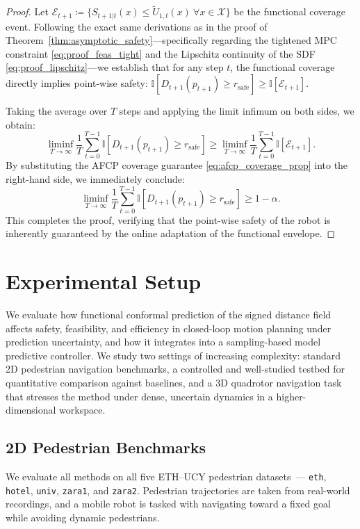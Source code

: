\documentclass[lettersize,journal]{IEEEtran}
\begin{document}
\begin{proof}
Let $\mathcal E_{t+1} \coloneqq \{ S_{t+1|t}(x)\le \widetilde U_{1,t}(x)\ \forall x\in\mathcal X \}$ be the functional coverage event.
Following the exact same derivations as in the proof of Theorem~\ref{thm:asymptotic_safety}—specifically regarding the tightened MPC constraint \eqref{eq:proof_feas_tight} and the Lipschitz continuity of the SDF \eqref{eq:proof_lipschitz}—we establish that for any step $t$, the functional coverage directly implies point-wise safety:
$\mathbb I\!\left[D_{t+1}(p_{t+1})\ge r_{\mathrm{safe}}\right] \ge \mathbb I[\mathcal E_{t+1}]$.

Taking the average over $T$ steps and applying the limit infimum on both sides, we obtain:
\[
\liminf_{T\to\infty} \frac{1}{T}\sum_{t=0}^{T-1} \mathbb I\!\left[D_{t+1}(p_{t+1})\ge r_{\mathrm{safe}}\right] \ge \liminf_{T\to\infty} \frac{1}{T}\sum_{t=0}^{T-1}\mathbb I[\mathcal E_{t+1}].
\]
By substituting the AFCP coverage guarantee \eqref{eq:afcp_coverage_prop} into the right-hand side, we immediately conclude:
\[
\liminf_{T\to\infty} \frac{1}{T}\sum_{t=0}^{T-1} \mathbb I\!\left[D_{t+1}(p_{t+1})\ge r_{\mathrm{safe}}\right] \ge 1-\alpha.
\]
This completes the proof, verifying that the point-wise safety of the robot is inherently guaranteed by the online adaptation of the functional envelope.
\end{proof}


\section{Experimental Setup}
We evaluate how functional conformal prediction of the signed distance field affects
safety, feasibility, and efficiency in closed-loop motion planning under prediction
uncertainty, and how it integrates into a sampling-based model predictive controller.
We study two settings of increasing complexity: standard 2D pedestrian navigation
benchmarks, a controlled and well-studied testbed for quantitative comparison against
baselines, and a 3D quadrotor navigation task that stresses the method under dense,
uncertain dynamics in a higher-dimensional workspace.

\subsection{2D Pedestrian Benchmarks}
We evaluate all methods on all five ETH--UCY pedestrian datasets~\cite{pellegrini2009you,lerner2007crowds}---
\texttt{eth}, \texttt{hotel}, \texttt{univ}, \texttt{zara1}, and \texttt{zara2}.
Pedestrian trajectories are taken from real-world recordings, and a mobile robot
is tasked with navigating toward a fixed goal while avoiding dynamic pedestrians.
\end{document}
